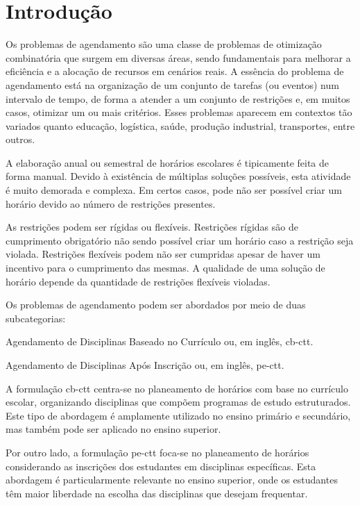 % 
%  
%
\chapter{Introdução}
\label{capitulo:introdução}

Os problemas de agendamento são uma classe de problemas de otimização combinatória que surgem em diversas áreas, sendo fundamentais para melhorar a eficiência e a alocação de recursos em cenários reais. A essência do problema de agendamento está na organização de um conjunto de tarefas (ou eventos) num intervalo de tempo, de forma a atender a um conjunto de restrições e, em muitos casos, otimizar um ou mais critérios. Esses problemas aparecem em contextos tão variados quanto educação, logística, saúde, produção industrial, transportes, entre outros.

A elaboração anual ou semestral de horários escolares é tipicamente feita de forma manual. Devido à existência de múltiplas soluções possíveis, esta atividade é muito demorada e complexa. Em certos casos, pode não ser possível criar um horário devido ao número de restrições presentes.

As restrições podem ser rígidas ou flexíveis. Restrições rígidas são de cumprimento obrigatório não sendo possível criar um horário caso a restrição seja violada. Restrições flexíveis podem não ser cumpridas apesar de haver um incentivo para o cumprimento das mesmas. A qualidade de uma solução de horário depende da quantidade de restrições flexíveis violadas.

Os problemas de agendamento podem ser abordados por meio de duas subcategorias:

\begin{compactitem}
    \item Agendamento de Disciplinas Baseado no Currículo ou, em inglês, \gls{cb-ctt}.
    \item Agendamento de Disciplinas Após Inscrição ou, em inglês, \gls{pe-ctt}.
\end{compactitem}

A formulação \gls{cb-ctt} centra-se no planeamento de horários com base no currículo escolar, organizando disciplinas que compõem programas de estudo estruturados. Este tipo de abordagem é amplamente utilizado no ensino primário e secundário, mas também pode ser aplicado no ensino superior.

Por outro lado, a formulação \gls{pe-ctt} foca-se no planeamento de horários considerando as inscrições dos estudantes em disciplinas específicas. Esta abordagem é particularmente relevante no ensino superior, onde os estudantes têm maior liberdade na escolha das disciplinas que desejam frequentar.

